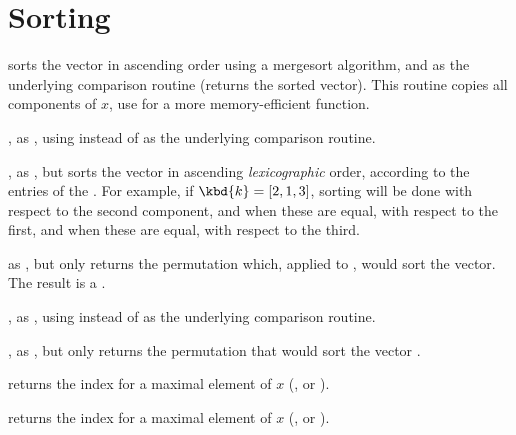 








\section{Sorting}


 sorts the vector  in ascending order using a
mergesort algorithm, and  as the underlying comparison routine
(returns the sorted vector). This routine copies all components of $x$, use
 for a more memory-efficient function.

, as , using  instead of
 as the underlying comparison routine.

, as , but sorts the
vector  in ascending \emph{lexicographic} order, according to the
entries of the  . For example,  if $\kbd{k} = [2,1,3]$,
sorting will be done with respect to the second component,  and when these
are  equal, with respect to the first,  and when these are equal,  with
respect to the third.


 as , but only returns the permutation
which, applied to , would sort the vector. The result is a
.

, as , using 
instead of  as the underlying comparison routine.

, as , but only
returns the permutation that would sort the vector .

 returns the index for a maximal element of $x$
(,  or ).

 returns the index for a maximal element of $x$
(,  or ).

